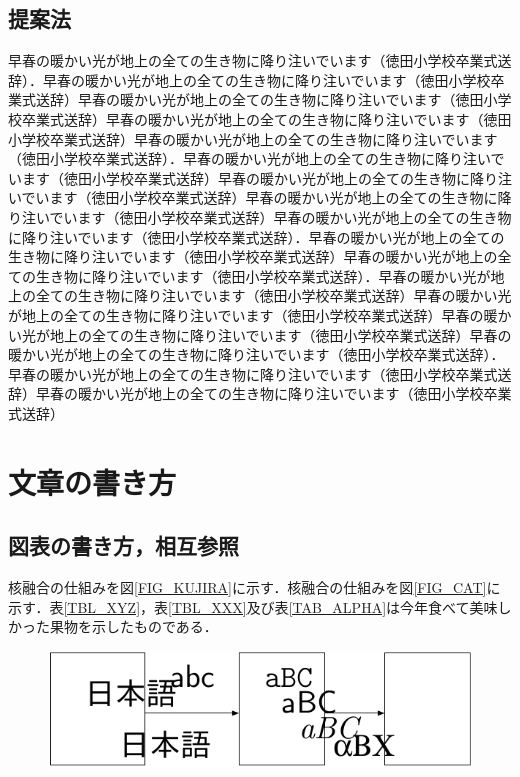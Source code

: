 \begin{multicols*}{2}
\subsection{提案法}
早春の暖かい光が地上の全ての生き物に降り注いでいます（徳田小学校卒業式送辞）．早春の暖かい光が地上の全ての生き物に降り注いでいます（徳田小学校卒業式送辞）早春の暖かい光が地上の全ての生き物に降り注いでいます（徳田小学校卒業式送辞）早春の暖かい光が地上の全ての生き物に降り注いでいます（徳田小学校卒業式送辞）早春の暖かい光が地上の全ての生き物に降り注いでいます（徳田小学校卒業式送辞）．早春の暖かい光が地上の全ての生き物に降り注いでいます（徳田小学校卒業式送辞）早春の暖かい光が地上の全ての生き物に降り注いでいます（徳田小学校卒業式送辞）早春の暖かい光が地上の全ての生き物に降り注いでいます（徳田小学校卒業式送辞）早春の暖かい光が地上の全ての生き物に降り注いでいます（徳田小学校卒業式送辞）．早春の暖かい光が地上の全ての生き物に降り注いでいます（徳田小学校卒業式送辞）早春の暖かい光が地上の全ての生き物に降り注いでいます（徳田小学校卒業式送辞）．早春の暖かい光が地上の全ての生き物に降り注いでいます（徳田小学校卒業式送辞）早春の暖かい光が地上の全ての生き物に降り注いでいます（徳田小学校卒業式送辞）早春の暖かい光が地上の全ての生き物に降り注いでいます（徳田小学校卒業式送辞）早春の暖かい光が地上の全ての生き物に降り注いでいます（徳田小学校卒業式送辞）．早春の暖かい光が地上の全ての生き物に降り注いでいます（徳田小学校卒業式送辞）早春の暖かい光が地上の全ての生き物に降り注いでいます（徳田小学校卒業式送辞）
\section{文章の書き方}
\subsection{図表の書き方，相互参照}
核融合の仕組みを図\ref{FIG_KUJIRA}に示す\cite{jp2k1,bk1}．核融合の仕組みを図\ref{FIG_CAT}に示す．表\ref{TBL_XYZ}，表\ref{TBL_XXX}及び表\ref{TAB_ALPHA}は今年食べて美味しかった果物を示したものである\cite{sdkguide}．

\begin{figure} %
	\centering
	\includegraphics[width=\linewidth]{fig/concept.pdf}
\end{figure}


\end{multicols*}
